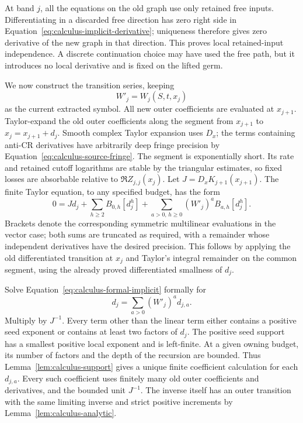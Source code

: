 At band $j$, all the equations on the old graph use only retained free
inputs.  Differentiating in a discarded free direction has zero right
side in Equation~\eqref{eq:calculus-implicit-derivative}; uniqueness
therefore gives zero derivative of the new graph in that direction.
This proves local retained-input independence.  A discrete continuation
choice may have used the free path, but it introduces no local derivative
and is fixed on the lifted germ.

We now construct the transition series, keeping
\[
 W'_j=W_j(S,t,x_j)
\]
as the current extracted symbol.  All new outer coefficients are evaluated
at $x_{j+1}$.  Taylor-expand the old outer coefficients along the segment
from $x_{j+1}$ to $x_j=x_{j+1}+d_j$.  Smooth complex Taylor expansion uses
$D_x$; the terms containing anti-CR derivatives have arbitrarily deep
fringe precision by Equation~\eqref{eq:calculus-source-fringe}.  The
segment is exponentially short.  Its rate and retained cutoff logarithms
are stable by the triangular estimates, so fixed losses are absorbable
relative to $\Re Z_{j,j}(x_j)$.  Let
$J=D_xK_{j+1}(x_{j+1})$.  The finite Taylor equation, to any specified
budget, has the form
\begin{equation}
 0=Jd_j+\sum_{h\ge2}B_{0,h}[d_j^h]
       +\sum_{a>0,\,h\ge0}(W'_j)^a B_{a,h}[d_j^h].
 \label{eq:calculus-formal-implicit}
\end{equation}
Brackets denote the corresponding symmetric multilinear evaluations in
the vector case; both sums are truncated as required, with a remainder
whose independent derivatives have the desired precision.  This follows
by applying the old differentiated transition at $x_j$ and Taylor's
integral remainder on the common segment, using the already proved
differentiated smallness of $d_j$.

Solve Equation~\eqref{eq:calculus-formal-implicit} formally for
\begin{equation}
 d_j=\sum_{a>0}(W'_j)^a d_{j,a}.
 \label{eq:calculus-implicit-series}
\end{equation}
Multiply by $J^{-1}$.  Every term other than the linear term either
contains a positive seed exponent or contains at least two factors of
$d_j$.  The positive seed support has a smallest positive local exponent
and is left-finite.  At a given owning budget, its number of factors and
the depth of the recursion are bounded.  Thus
Lemma~\ref{lem:calculus-support} gives a unique finite coefficient
calculation for each $d_{j,a}$.  Every such coefficient uses finitely many
old outer coefficients and derivatives, and the bounded unit $J^{-1}$.
The inverse itself has an outer transition with the same limiting
inverse and strict positive increments by
Lemma~\ref{lem:calculus-analytic}.

